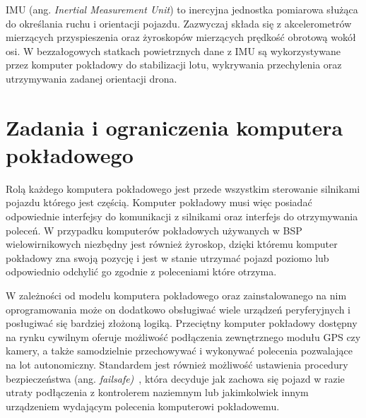 \documentclass[a4paper,12pt]{book}
\begin{document}
IMU (ang. \textit{Inertial Measurement Unit}) to inercyjna jednostka pomiarowa służąca do określania ruchu i orientacji pojazdu. Zazwyczaj składa się z akcelerometrów mierzących przyspieszenia oraz 
żyroskopów mierzących prędkość obrotową wokół osi. W bezzałogowych statkach powietrznych dane z IMU są wykorzystywane przez komputer pokładowy do stabilizacji lotu, wykrywania przechylenia 
oraz utrzymywania zadanej orientacji drona.
\section{Zadania i ograniczenia komputera pokładowego}
        Rolą każdego komputera pokładowego jest przede wszystkim sterowanie silnikami pojazdu którego jest częścią. Komputer pokładowy musi więc posiadać odpowiednie 
        interfejsy do komunikacji z silnikami oraz interfejs do otrzymywania poleceń. W przypadku komputerów pokładowych używanych w BSP wielowirnikowych niezbędny jest również żyroskop, 
        dzięki któremu komputer pokładowy zna swoją pozycję i jest w stanie utrzymać pojazd poziomo lub odpowiednio odchylić go zgodnie z poleceniami które otrzyma.\par
        W zależności od modelu komputera pokładowego oraz zainstalowanego na nim oprogramowania może on dodatkowo obsługiwać wiele urządzeń peryferyjnych i posługiwać się bardziej złożoną logiką.
        Przeciętny komputer pokładowy dostępny na rynku cywilnym oferuje możliwość podłączenia zewnętrznego modułu GPS czy kamery, a także samodzielnie przechowywać i wykonywać polecenia 
        pozwalające na lot autonomiczny. Standardem jest również możliwość ustawienia procedury bezpieczeństwa (ang. \textit{failsafe)}~\cite{web:ardupilot:failsafe}, która decyduje jak zachowa się pojazd w razie utraty podłączenia
        z kontrolerem naziemnym lub jakimkolwiek innym urządzeniem wydającym polecenia komputerowi pokładowemu.
\end{document}
